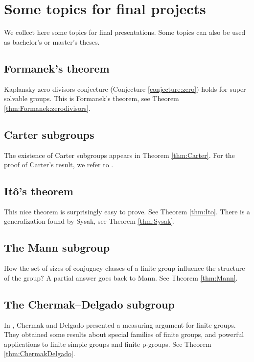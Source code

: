 \section*{Some topics for final projects}

\fancyhf{}
\fancyfoot[R]{\thepage}
\fancyhead[L]{\course}
\setlength{\headheight}{14pt}

We collect here some topics for final presentations. Some topics
can also be used as bachelor's or master's theses.

\subsection*{Formanek's theorem}

Kaplansky zero divisors conjecture (Conjecture \ref{conjecture:zero}) 
holds for super-solvable groups. 
This is Formanek's theorem, see Theorem \ref{thm:Formanek:zerodivisors}. 

\subsection*{Carter subgroups}

The existence of Carter subgroups appears in Theorem \ref{thm:Carter}. For the proof of Carter's result, we refer to \cite{MR0123603}.

\subsection*{It\^o's theorem}

This nice theorem is surprisingly easy to prove. See Theorem \ref{thm:Ito}. There is a generalization
found by Sysak, see Theorem \ref{thm:Sysak}. 

\subsection*{The Mann subgroup}

How the set of sizes of conjugacy classes of a finite group influence 
the structure of the group? A partial answer goes back to Mann. See Theorem \ref{thm:Mann}. 

\subsection*{The Chermak--Delgado subgroup}

In \cite{MR0994774}, 
Chermak and Delgado presented a measuring argument for finite groups. They obtained some results about special families of finite groups, and powerful applications to finite simple groups and finite p-groups. See Theorem \ref{thm:ChermakDelgado}. 

